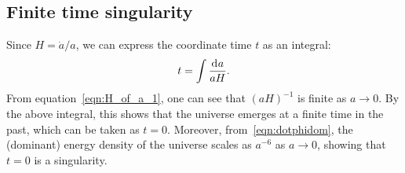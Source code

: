 \subsection{Finite time singularity}

Since \(H = \dot{a}/a\), we can express the coordinate time \(t\) as an integral: 
%
\begin{equation}
  t = \int \frac{\operatorname{d}^{}\!{a}}{aH}.
\end{equation}
%
From equation~\eqref{eqn:H_of_a_1}, one can see that \({(aH)}^{-1}\) is finite as \(a\to0\). By the above integral, this shows that the universe emerges at a finite time in the past, which can be taken as \(t=0\).  Moreover, from~\eqref{eqn:dotphidom}, the (dominant) energy density of the universe scales as \(a^{-6}\) as \(a \to 0\), showing that \(t=0\) is a singularity.

